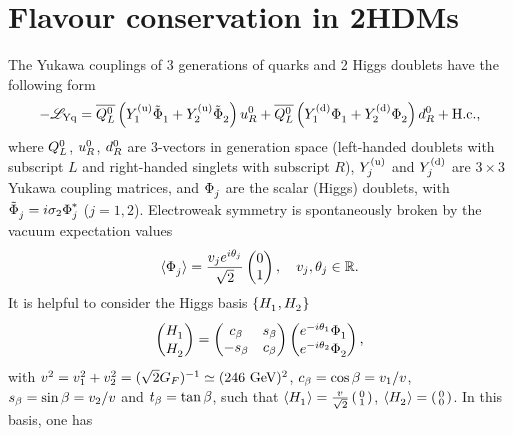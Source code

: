 \documentclass[12pt,a4paper]{article}
\begin{document}
\section{Flavour conservation in 2HDMs\label{SEC:Generalities}}
The Yukawa couplings of 3 generations of quarks and 2 Higgs doublets have the following form
\begin{equation}\label{eq:LYuk:00}
-\mathscr L_{\rm Yq}= \wQLb\left(\YU{1}\SDC{1}+\YU{2}\SDC{2}\right)\wUR+\wQLb\left(\YD{1}\SD{1}+\YD{2}\SD{2}\right)\wDR+\Hc,
\end{equation}
where $Q_L^0$, $u_R^0$, $d_R^0$ are 3-vectors in generation space (left-handed doublets with subscript $L$ and right-handed singlets with subscript $R$), $Y_{j}^{\rm (u)}$ and $Y_{j}^{\rm (d)}$ are $3\times 3$ Yukawa coupling matrices, and $\SD{j}$ are the scalar (Higgs) doublets, with $\SDC{j}=i\sigma_2\SDc{j}$ ($j=1,2$).
Electroweak symmetry is spontaneously broken by the vacuum expectation values
\begin{equation}\label{eq:vevs}
\VEV{\SD{j}}=\frac{\vev{j}e^{i\vevPh{j}}}{\sqrt 2}\begin{pmatrix}0\\ 1\end{pmatrix},\quad \vev{j},\vevPh{j}\in\mathbb{R}.
\end{equation}
It is helpful to consider the Higgs basis $\{\HSD{1},\HSD{2}\}$ \cite{Donoghue:1978cj,Georgi:1978ri,Botella:1994cs}
\begin{equation}
 \begin{pmatrix} \HSD{1} \\ \HSD{2}\end{pmatrix}=
 \begin{pmatrix} \Cb & \Sb\\ -\Sb & \Cb \end{pmatrix}
 \begin{pmatrix} e^{-i\vevPh{1}}\SD{1}\\ e^{-i\vevPh{2}}\SD{2}\end{pmatrix},
\end{equation}
with $v_{}^2=v_{1}^2+v_{2}^2=(\sqrt 2 G_F)^{-1}\simeq (246\ \text{GeV})^2$, $c_\beta=\cos\beta=v_{1}/v_{}$, $s_\beta=\sin\beta=v_{2}/v_{}$ and $t_\beta=\tan\beta$, such that $\VEV{\HSD{1}}=\frac{\vev{}}{\sqrt 2}\left(\begin{smallmatrix}0\\ 1\end{smallmatrix}\right)$, $\VEV{\HSD{2}}=\left(\begin{smallmatrix}0\\ 0\end{smallmatrix}\right)$. In this basis, one has
\end{document}
